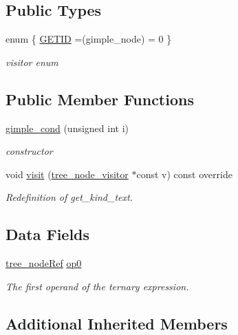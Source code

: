 \subsection*{Public Types}
\begin{DoxyCompactItemize}
\item 
enum \{ \hyperlink{structgimple__cond_a9b7ef000d824653671c72fecd2ecaa10a81861a918db37204ce346f026a0a7e99}{G\+E\+T\+ID} =(gimple\+\_\+node) = 0
 \}\begin{DoxyCompactList}\small\item\em visitor enum \end{DoxyCompactList}
\end{DoxyCompactItemize}
\subsection*{Public Member Functions}
\begin{DoxyCompactItemize}
\item 
\hyperlink{structgimple__cond_aa3141fe9a7adbb64be5d617575645124}{gimple\+\_\+cond} (unsigned int i)
\begin{DoxyCompactList}\small\item\em constructor \end{DoxyCompactList}\item 
void \hyperlink{structgimple__cond_a1985767ad1b09766b8d32897826dbf48}{visit} (\hyperlink{classtree__node__visitor}{tree\+\_\+node\+\_\+visitor} $\ast$const v) const override
\begin{DoxyCompactList}\small\item\em Redefinition of get\+\_\+kind\+\_\+text. \end{DoxyCompactList}\end{DoxyCompactItemize}
\subsection*{Data Fields}
\begin{DoxyCompactItemize}
\item 
\hyperlink{tree__node_8hpp_a6ee377554d1c4871ad66a337eaa67fd5}{tree\+\_\+node\+Ref} \hyperlink{structgimple__cond_af285b7f9dc9765f7444ac88a286062b6}{op0}
\begin{DoxyCompactList}\small\item\em The first operand of the ternary expression. \end{DoxyCompactList}\end{DoxyCompactItemize}
\subsection*{Additional Inherited Members}


